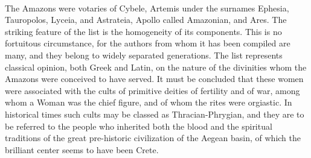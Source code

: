 \documentclass[a4paper, 12pt, oneside]{article}
\begin{document}
\paragraph{}
The Amazons were votaries of Cybele, Artemis under the surnames Ephesia, Tauropolos, Lyceia, and Astrateia, Apollo called Amazonian, and Ares. The striking feature of the list is the homogeneity of its components. This is no fortuitous circumstance, for the authors from whom it has been compiled are many, and they belong to widely separated generations. The list represents classical opinion, both Greek and Latin, on the nature of the divinities whom the Amazons were conceived to have served. It must be concluded that these women were associated with the cults of primitive deities of fertility and of war, among whom a Woman was the chief figure, and of whom the rites were orgiastic. In historical times such cults may be classed as Thracian-Phrygian, and they are to be referred to the people who inherited both the blood and the spiritual traditions of the great pre-historic civilization of the Aegean basin, of which the brilliant center seems to have been Crete.
\end{document}

